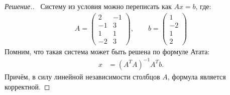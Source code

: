 \documentclass[a4paper]{article}
\theoremstyle{remark}
\begin{document}
        \begin{proof}[Решение.] \ 
        Систему из условия можно переписать как $Ax = b$, где:
        \begin{align*}
          A = \begin{pmatrix}
            2 & -1 \\
            -1 & 3 \\
            1 & 1 \\
            -2 & 3 
          \end{pmatrix}, \quad\quad 
          b = \begin{pmatrix}
            1 \\
            -2 \\
            1 \\
            2
          \end{pmatrix}
        \end{align*}
        Помним, что такая система может быть решена по формуле Атата:
        \begin{align*}
          x &= (A^TA)^{-1}A^Tb.
        \end{align*}
        Причём, в силу линейной независимости столбцов $A$, формула является корректной.


\end{proof}
\end{document}
